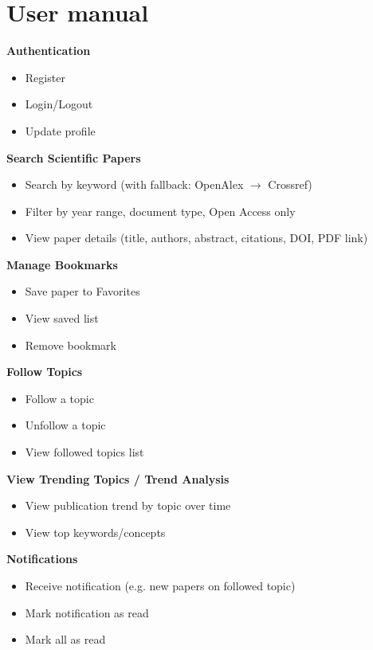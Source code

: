 \documentclass[12pt,a4paper]{article}
\begin{document}
{{\section{  User manual}


\textbf{Authentication}
\begin{itemize}[leftmargin=*, itemsep=1pt, topsep=2pt, label=--]
	\item Register
	\item Login/Logout
	\item Update profile
\end{itemize}

\textbf{Search Scientific Papers}
\begin{itemize}[leftmargin=*, itemsep=1pt, topsep=2pt, label=--]
	\item Search by keyword (with fallback: OpenAlex $\rightarrow$ Crossref)
	\item Filter by year range, document type, Open Access only
	\item View paper details (title, authors, abstract, citations, DOI, PDF link)
\end{itemize}

\textbf{Manage Bookmarks}
\begin{itemize}[leftmargin=*, itemsep=1pt, topsep=2pt, label=--]
	\item Save paper to Favorites
	\item View saved list
	\item Remove bookmark
\end{itemize}

\textbf{Follow Topics}
\begin{itemize}[leftmargin=*, itemsep=1pt, topsep=2pt, label=--]
	\item Follow a topic
	\item Unfollow a topic
	\item View followed topics list
\end{itemize}

\textbf{View Trending Topics / Trend Analysis}
\begin{itemize}[leftmargin=*, itemsep=1pt, topsep=2pt, label=--]
	\item View publication trend by topic over time
	\item View top keywords/concepts
\end{itemize}

\textbf{Notifications}
\begin{itemize}[leftmargin=*, itemsep=1pt, topsep=2pt, label=--]
	\item Receive notification (e.g. new papers on followed topic)
	\item Mark notification as read
	\item Mark all as read
\end{itemize}



}}
\end{document}
